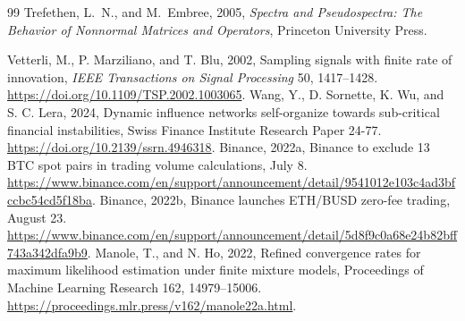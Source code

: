 \documentclass[12pt]{article}
\theoremstyle{definition}
\theoremstyle{remark}
\begin{document}
\begin{thebibliography}{99}
Trefethen, L.~N., and M.~Embree, 2005, \emph{Spectra and Pseudospectra: The Behavior of Nonnormal Matrices and Operators}, Princeton University Press.


 Vetterli, M., P. Marziliano, and T. Blu, 2002, Sampling signals with finite rate of innovation, \emph{IEEE Transactions on Signal Processing} 50, 1417--1428. \url{https://doi.org/10.1109/TSP.2002.1003065}.
 Wang, Y., D. Sornette, K. Wu, and S. C. Lera, 2024, Dynamic influence networks self-organize towards sub-critical financial instabilities, Swiss Finance Institute Research Paper 24-77. \url{https://doi.org/10.2139/ssrn.4946318}.
 Binance, 2022a, Binance to exclude 13 BTC spot pairs in trading volume calculations, July 8. \url{https://www.binance.com/en/support/announcement/detail/9541012e103c4ad3bfccbc54cd5f18ba}.
 Binance, 2022b, Binance launches ETH/BUSD zero-fee trading, August 23. \url{https://www.binance.com/en/support/announcement/detail/5d8f9c0a68e24b82bff743a342dfa9b9}.
 Manole, T., and N. Ho, 2022, Refined convergence rates for maximum likelihood estimation under finite mixture models, Proceedings of Machine Learning Research 162, 14979--15006. \url{https://proceedings.mlr.press/v162/manole22a.html}.
\end{thebibliography}
\end{document}
